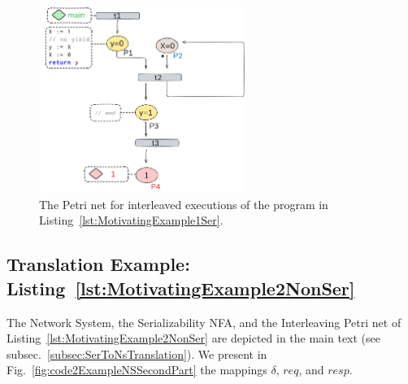 \begin{figure}[H]
	\centering
	\includegraphics[width=0.6\textwidth]{plots/code_1_PN_with_annotation.png}
	\caption{The Petri net for interleaved executions of the program in Listing~\ref{lst:MotivatingExample1Ser}.}
	\label{fig:code1ExamplePN}
\end{figure}


%

\subsection{Translation Example: Listing~\ref{lst:MotivatingExample2NonSer}}
\label{appendix:subsec::Ex1B:NS}

The Network System, the Serializability NFA, and the Interleaving Petri net of Listing~\ref{lst:MotivatingExample2NonSer} are depicted in the main text (see subsec.~\ref{subsec:SerToNsTranslation}).
%
We present in Fig.~\ref{fig:code2ExampleNSSecondPart} the mappings \(\delta\), $req$, and $resp$.

